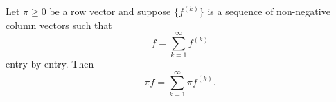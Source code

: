 Let $\pi \geq 0$ be a row vector and suppose $\{f^{(k)}\}$ is a sequence of non-negative column vectors such that
$$f = \sum_{k=1}^{\infty} f^{(k)}$$
entry-by-entry. Then
$$\pi f = \sum_{k=1}^{\infty} \pi f^{(k)}.$$
